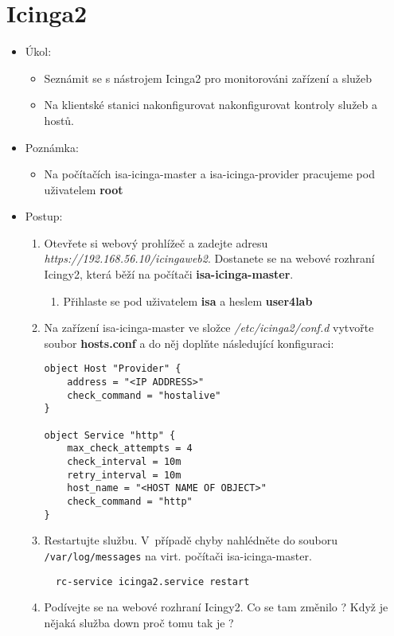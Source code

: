 \section{Icinga2}
  \begin{itemize}
    \item Úkol: 
    \begin{itemize}
      \item Seznámit se s nástrojem Icinga2 pro monitorováni zařízení a služeb 
      \item Na klientské stanici nakonfigurovat nakonfigurovat kontroly služeb a hostů.  
    \end{itemize}
    \item Poznámka:
        \begin{itemize}
            \item Na počítačích isa-icinga-master a isa-icinga-provider pracujeme pod uživatelem \textbf{root}
        \end{itemize}
    \item Postup:
       \begin{enumerate}   
            \item Otevřete si webový prohlížeč a zadejte adresu 
            \textit{https://192.168.56.10/icingaweb2}. Dostanete se na webové rozhraní Icingy2,
            která běží na počítači \textbf{isa-icinga-master}.
               \begin{enumerate}
                   \item Přihlaste se pod uživatelem \textbf{isa} a heslem \textbf{user4lab}
               \end{enumerate}
            \item Na zařízení isa-icinga-master ve složce \textit{/etc/icinga2/conf.d} vytvořte soubor \textbf{hosts.conf} a do něj doplňte následující konfiguraci:
\begin{verbatim}
object Host "Provider" {
    address = "<IP ADDRESS>"
    check_command = "hostalive"
}

object Service "http" {
    max_check_attempts = 4
    check_interval = 10m
    retry_interval = 10m
    host_name = "<HOST NAME OF OBJECT>"
    check_command = "http"
}

\end{verbatim} 
            \item Restartujte službu. V~případě chyby nahlédněte do souboru \texttt{/var/log/messages} na virt. počítači isa-icinga-master.
\begin{verbatim}
  rc-service icinga2.service restart
\end{verbatim} 
          \item Podívejte se na webové rozhraní Icingy2. Co se tam změnilo ? 
          Když je nějaká služba down proč tomu tak je ?


\end{enumerate}
\end{itemize}
